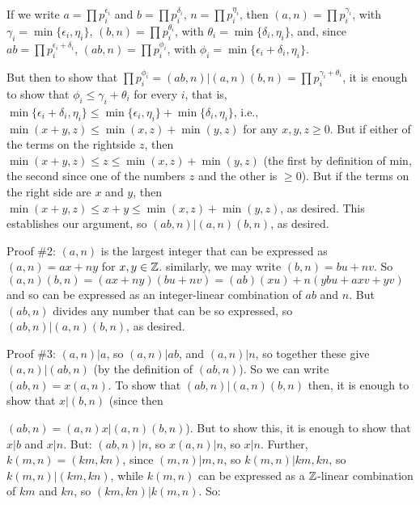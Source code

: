 \ssk

\item{} If we write $a=\prod p_i^{\epsilon_i}$ and $b=\prod p_i^{\delta_i}$, $n=\prod p_i^{\eta_i}$, 
then 
$(a,n)=\prod p_i^{\gamma_i}$, with $\gamma_i=\min\{\epsilon_i,\eta_i\}$,
$(b,n)=\prod p_i^{\theta_i}$, with $\theta_i=\min\{\delta_i,\eta_i\}$,
and, since $ab=\prod p_i^{\epsilon_i+\delta_i}$,
$(ab,n)=\prod p_i^{\phi_i}$, with $\phi_i=\min\{\epsilon_i+\delta_i,\eta_i\}$.

\ssk

\item{} But then to show that 
$\prod p_i^{\phi_i}=(ab,n)|(a,n)(b,n)=\prod p_i^{\gamma_i+\theta_i}$, it is enough to show
that $\phi_i\leq\gamma_i+\theta_i$ for every $i$, that is,
$\min\{\epsilon_i+\delta_i,\eta_i\}\leq \min\{\epsilon_i,\eta_i\}+\min\{\delta_i,\eta_i\}$, i.e., 
$\min(x+y,z)\leq \min(x,z)+\min(y,z)$ for any $x,y,z\geq 0$. But if
either of the terms on the rightside  $z$, then 
$\min(x+y,z)\leq z\leq \min(x,z)+\min(y,z)$ (the first by definition of min, the second since one of
the numbers  $z$ and the other is $\geq 0$). But if the terms on the right side are
$x$ and $y$, then $\min(x+y,z)\leq x+y\leq \min(x,z)+\min(y,z)$, as desired. This establishes
our argument, so $(ab,n)|(a,n)(b,n)$, as desired.

\msk

\item{} Proof \#2: $(a,n)$ is the largest integer that can be expressed as
$(a,n)=ax+ny$ for $x,y\in {\Bbb Z}$. similarly, we may write $(b,n)=bu+nv$. So 
$(a,n)(b,n)=(ax+ny)(bu+nv)=(ab)(xu)+n(ybu+axv+yv)$ and so can be expressed as an 
integer-linear combination of $ab$ and $n$. But $(ab,n)$ divides any number that
can be so expressed, so $(ab,n)|(a,n)(b,n)$, as desired.

\msk

\item{} Proof \#3: $(a,n)|a$, so $(a,n)|ab$, and $(a,n)|n$, so together these give $(a,n)|(ab,n)$
(by the definition of $(ab,n)$). 
So we can write $(ab,n)=x(a,n)$. To show that $(ab,n)|(a,n)(b,n)$ then, it is enough to show that
$x|(b,n)$ (since then \hfill

\item{} $(ab,n)=(a,n)x|(a,n)(b,n)$). 
But to show this, it is enough to show that $x|b$ and $x|n$. But:
$(ab,n)|n$, so $x(a,n)|n$, so $x|n$. Further, 
$k(m,n)=(km,kn)$, since $(m,n)|m,n$, so $k(m,n)|km,kn$, so $k(m,n)|(km,kn)$,
while $k(m,n)$ can be expressed as a ${\Bbb Z}$-linear combination of 
$km$ and $kn$, so $(km,kn)|k(m,n)$. So:

